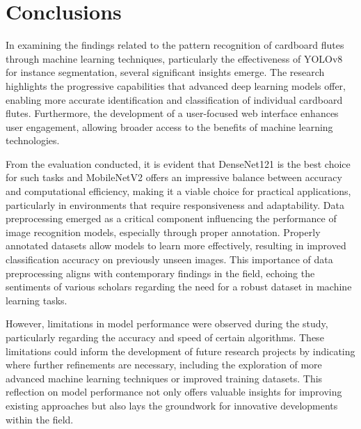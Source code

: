 \chapter{Conclusions}
\label{c:conc}

In examining the findings related to the pattern recognition of cardboard flutes through machine learning techniques, particularly the effectiveness of YOLOv8 for instance segmentation, several significant insights emerge. The research highlights the progressive capabilities that advanced deep learning models offer, enabling more accurate identification and classification of individual cardboard flutes. Furthermore, the development of a user-focused web interface enhances user engagement, allowing broader access to the benefits of machine learning technologies.

From the evaluation conducted, it is evident that DenseNet121 is the best choice for such tasks and MobileNetV2 offers an impressive balance between accuracy and computational efficiency, making it a viable choice for practical applications, particularly in environments that require responsiveness and adaptability. Data preprocessing emerged as a critical component influencing the performance of image recognition models, especially through proper annotation. Properly annotated datasets allow models to learn more effectively, resulting in improved classification accuracy on previously unseen images. This importance of data preprocessing aligns with contemporary findings in the field, echoing the sentiments of various scholars regarding the need for a robust dataset in machine learning tasks.

However, limitations in model performance were observed during the study, particularly regarding the accuracy and speed of certain algorithms. These limitations could inform the development of future research projects by indicating where further refinements are necessary, including the exploration of more advanced machine learning techniques or improved training datasets. This reflection on model performance not only offers valuable insights for improving existing approaches but also lays the groundwork for innovative developments within the field.

